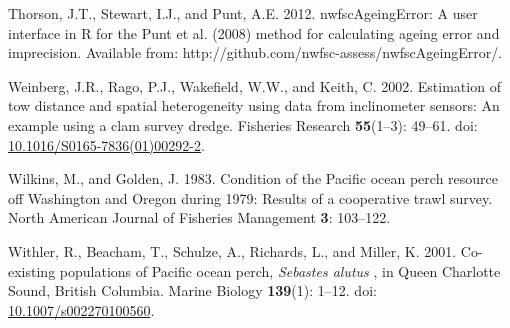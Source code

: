 \documentclass[12pt,]{article}
\begin{document}
\hypertarget{ref-thorson_nwfscageingerror:_2012}{}
Thorson, J.T., Stewart, I.J., and Punt, A.E. 2012. nwfscAgeingError: A
user interface in R for the Punt et al. (2008) method for calculating
ageing error and imprecision. Available from:
http://github.com/nwfsc-assess/nwfscAgeingError/.

\hypertarget{ref-weinberg_estimation_2002}{}
Weinberg, J.R., Rago, P.J., Wakefield, W.W., and Keith, C. 2002.
Estimation of tow distance and spatial heterogeneity using data from
inclinometer sensors: An example using a clam survey dredge. Fisheries
Research \textbf{55}(1--3): 49--61. doi:
\href{https://doi.org/10.1016/S0165-7836(01)00292-2}{10.1016/S0165-7836(01)00292-2}.

\hypertarget{ref-wilkins_condition_1983}{}
Wilkins, M., and Golden, J. 1983. Condition of the Pacific ocean perch
resource off Washington and Oregon during 1979: Results of a cooperative
trawl survey. North American Journal of Fisheries Management \textbf{3}:
103--122.

\hypertarget{ref-withler_co-existing_2001}{}
Withler, R., Beacham, T., Schulze, A., Richards, L., and Miller, K.
2001. Co-existing populations of Pacific ocean perch, \emph{Sebastes
alutus} , in Queen Charlotte Sound, British Columbia. Marine Biology
\textbf{139}(1): 1--12. doi:
\href{https://doi.org/10.1007/s002270100560}{10.1007/s002270100560}.
\end{document}
